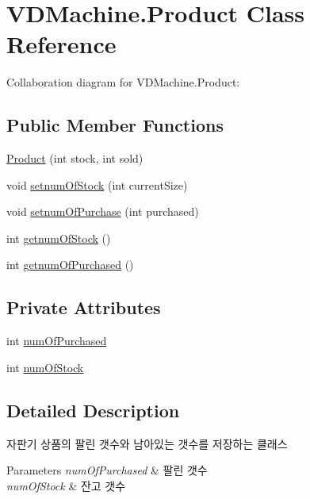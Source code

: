 \hypertarget{class_v_d_machine_1_1_product}{}\section{V\+D\+Machine.\+Product Class Reference}
\label{class_v_d_machine_1_1_product}


Collaboration diagram for V\+D\+Machine.\+Product\+:
\subsection*{Public Member Functions}
\begin{DoxyCompactItemize}
\item 
\hyperlink{class_v_d_machine_1_1_product_a8c91ef431ab45f01827883a04e7794d6}{Product} (int stock, int sold)
\item 
void \hyperlink{class_v_d_machine_1_1_product_a853bc0832f83adbe94b72c7b0325924c}{setnum\+Of\+Stock} (int current\+Size)
\item 
void \hyperlink{class_v_d_machine_1_1_product_a80b96d732b8662e04e20b9ac42d341d1}{setnum\+Of\+Purchase} (int purchased)
\item 
int \hyperlink{class_v_d_machine_1_1_product_ad46403380a869a8bdc51d576e1f634af}{getnum\+Of\+Stock} ()
\item 
int \hyperlink{class_v_d_machine_1_1_product_a39a5c9ec9a5c53b37ce404c93ab93abc}{getnum\+Of\+Purchased} ()
\end{DoxyCompactItemize}
\subsection*{Private Attributes}
\begin{DoxyCompactItemize}
\item 
int \hyperlink{class_v_d_machine_1_1_product_a3d32f0cbdbca2827634d8743ab8a744b}{num\+Of\+Purchased}
\item 
int \hyperlink{class_v_d_machine_1_1_product_a8cb19a2414b353b0d928ad35e7dde1ee}{num\+Of\+Stock}
\end{DoxyCompactItemize}


\subsection{Detailed Description}
자판기 상품의 팔린 갯수와 남아있는 갯수를 저장하는 클래스 
\begin{DoxyParams}{Parameters}
{\em num\+Of\+Purchased} & 팔린 갯수 \\
\hline
{\em num\+Of\+Stock} & 잔고 갯수 \\
\hline
\end{DoxyParams}


